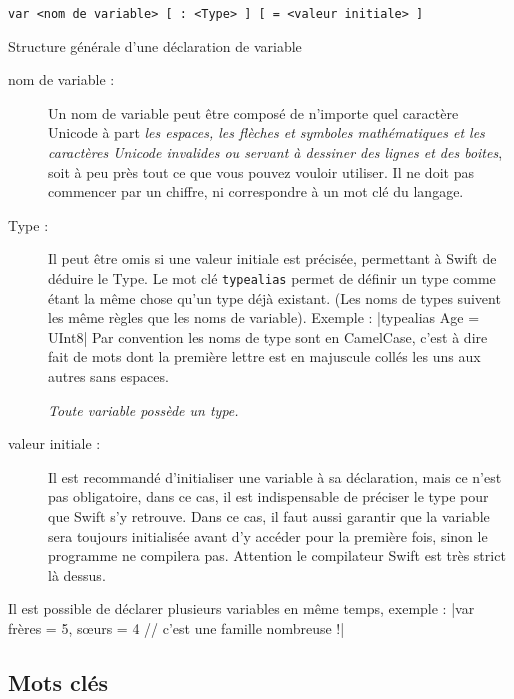 \begin{listing}[h]
\begin{verbatim}
var <nom de variable> [ : <Type> ] [ = <valeur initiale> ]
\end{verbatim}
\caption{Structure générale d'une déclaration de variable}
\end{listing}

\begin{description}

\item[nom de variable :]
Un nom de variable peut être composé de n'importe quel caractère Unicode
à part \emph{les espaces, les flèches et symboles mathématiques et les
caractères Unicode invalides ou servant à dessiner des lignes et des boites},
soit à peu près tout ce que vous pouvez vouloir utiliser.
Il ne doit pas commencer par un chiffre, ni correspondre à un mot clé du langage.


\item[Type :] Il peut être omis si une valeur initiale est précisée,
permettant à Swift de déduire le Type.
Le mot clé \texttt{typealias} permet de définir un type
comme étant la même chose qu'un type déjà existant.
(Les noms de types suivent les même règles que les noms de variable).
Exemple :
|typealias Age = UInt8|
Par convention les noms de type sont en CamelCase,
c'est à dire fait de mots dont la première lettre est en majuscule
collés les uns aux autres sans espaces.

\emph{Toute variable possède un type.}

\item[valeur initiale :]
Il est recommandé d'initialiser une variable à sa déclaration,
mais ce n'est pas obligatoire,
dans ce cas, il est indispensable de préciser le type pour que Swift s'y retrouve. 
Dans ce cas, il faut aussi garantir que la variable sera toujours initialisée
avant d'y accéder pour la première fois, sinon le programme ne compilera pas.
Attention le compilateur Swift est très strict là dessus.
\end{description}

Il est possible de déclarer plusieurs variables en même temps, exemple :
|var frères = 5, sœurs = 4 // c'est une famille nombreuse !|
\subsection{Mots clés}

